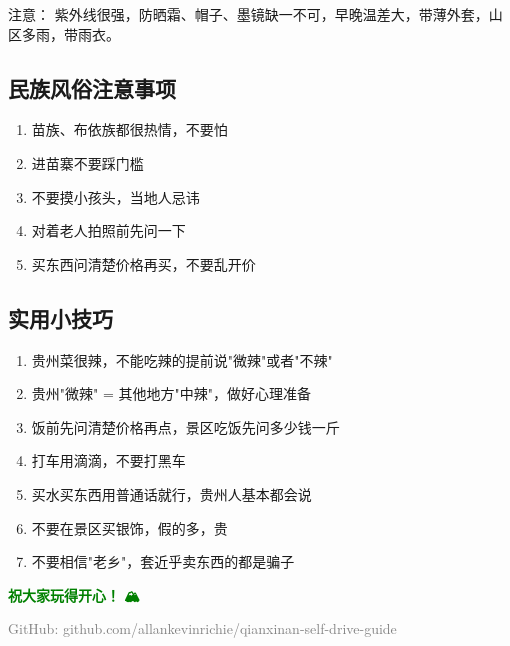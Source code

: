 \documentclass[12pt,a4paper,UTF8]{ctexart}
\begin{document}
注意：
紫外线很强，防晒霜、帽子、墨镜缺一不可，早晚温差大，带薄外套，山区多雨，带雨衣。

\subsection{民族风俗注意事项}
\begin{enumerate}
\item 苗族、布依族都很热情，不要怕
\item 进苗寨不要踩门槛
\item 不要摸小孩头，当地人忌讳
\item 对着老人拍照前先问一下
\item 买东西问清楚价格再买，不要乱开价
\end{enumerate}

\subsection{实用小技巧}
\begin{enumerate}
\item 贵州菜很辣，不能吃辣的提前说"微辣"或者"不辣"
\item 贵州"微辣" = 其他地方"中辣"，做好心理准备
\item 饭前先问清楚价格再点，景区吃饭先问多少钱一斤
\item 打车用滴滴，不要打黑车
\item 买水买东西用普通话就行，贵州人基本都会说
\item 不要在景区买银饰，假的多，贵
\item 不要相信"老乡"，套近乎卖东西的都是骗子
\end{enumerate}

\vspace{2cm}
\begin{center}
\Huge \textcolor{green}{\textbf{祝大家玩得开心！🚗🏔️🌊}}
\end{center}

\vfill
\begin{center}
\textcolor{gray}{GitHub: github.com/allankevinrichie/qianxinan-self-drive-guide}
\end{center}
\end{document}
